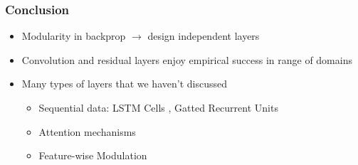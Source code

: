 \documentclass[10pt,mathserif]{beamer}
\begin{document}
\begin{frame}
  \frametitle{Conclusion}
 \begin{itemize}
 \item Modularity in backprop $\rightarrow$ design independent layers
 \item Convolution and residual layers enjoy empirical success in range of
   domains
 \item Many types of layers that we haven't discussed
   \begin{itemize}
   \item Sequential data: LSTM Cells \citep{schmidhuber1997long}, Gatted
     Recurrent Units \citep{chung2014empirical}
   \item Attention mechanisms \citep{bahdanau2014neural}
   \item Feature-wise Modulation \citep{perez2017film}
   \end{itemize}
 \end{itemize}
\end{frame}
\end{document}
